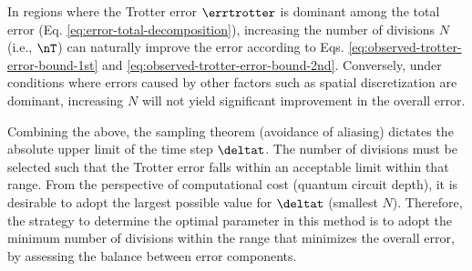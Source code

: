\documentclass[manuscript_main.tex]{subfiles}
\begin{document}
In regions where the Trotter error $\errtrotter$ is dominant among the total
error (Eq. \eqref{eq:error-total-decomposition}), increasing the number of
divisions $N$ (i.e., $\nT$) can naturally improve the error according to Eqs.
\eqref{eq:observed-trotter-error-bound-1st} and
\eqref{eq:observed-trotter-error-bound-2nd}. Conversely, under conditions where
errors caused by other factors such as spatial discretization are dominant,
increasing $N$ will not yield significant improvement in the overall error.

Combining the above, the sampling theorem (avoidance of aliasing) dictates the
absolute upper limit of the time step $\deltat$. The number of divisions must be
selected such that the Trotter error falls within an acceptable limit within that
range. From the perspective of computational cost (quantum circuit depth), it is
desirable to adopt the largest possible value for $\deltat$ (smallest $N$).
Therefore, the strategy to determine the optimal parameter in this method is to
adopt the minimum number of divisions within the range that minimizes the
overall error, by assessing the balance between error components.

\ifSubfilesClassLoaded{}{}
\end{document}
